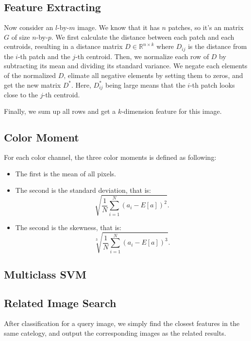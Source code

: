 \documentclass{acm_proc_article-sp}
\begin{document}

\subsection{Feature Extracting}

Now consider an $l$-by-$m$ image.
We know that it has $n$ patches, so it's an matrix $G$ of size $n$-by-$p$.
We first calculate the distance between each patch
and each centroids, resulting in a distance matrix $D\in\mathbb{R}^{n\times k}$
where $D_{ij}$ is the distance from the $i$-th patch
and the $j$-th centroid.
Then, we normalize each row of $D$ by
    subtracting its mean and dividing its standard variance.
We negate each elements of the normalized $D$, elimate
    all negative elements by setting them to zeros,
    and get the new matrix $D^*$.
Here, $D^*_{ij}$ being large means that the $i$-th patch
    looks close to the $j$-th centroid.

Finally, we sum up all rows and get a $k$-dimension feature for this image.

\subsection{Color Moment}

For each color channel, the three color moments is defined as following:
\begin{itemize}
    \item The first is the mean of all pixels.
    \item The second is the standard deviation, that is:
        \[
            \sqrt{\frac{1}{N} \sum_{i=1}^N {(a_i-E[a])}^2}.
        \]
    \item The second is the skewness, that is:
        \[
            \sqrt[3]{\frac{1}{N} \sum_{i=1}^N {(a_i-E[a])}^3}.
        \]
\end{itemize}

\subsection{Multiclass SVM}

\subsection{Related Image Search}

After classification for a query image,
    we simply find the closest features in the same catelogy,
    and output the corresponding images as the related results.
\end{document}
